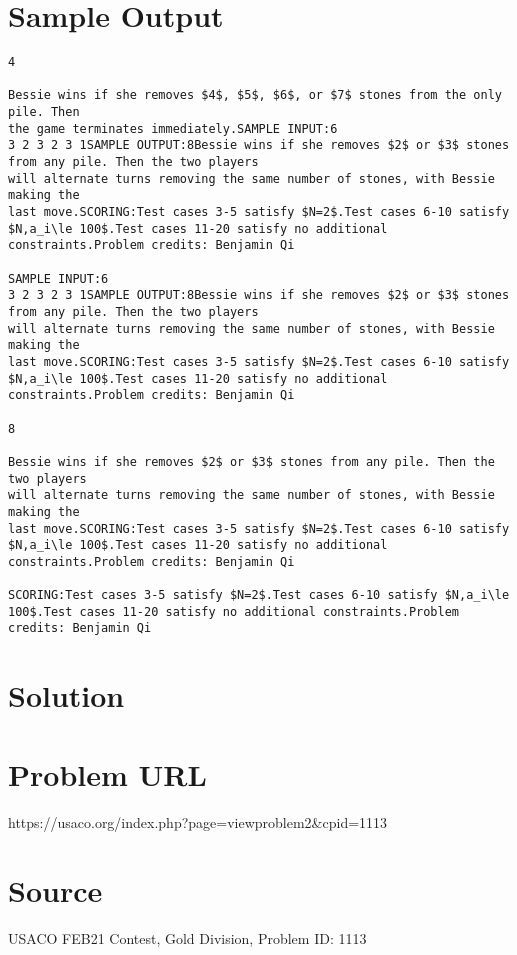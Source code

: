 \documentclass[12pt]{article}
\begin{document}
\section*{Sample Output}
\begin{verbatim}
4

Bessie wins if she removes $4$, $5$, $6$, or $7$ stones from the only pile. Then
the game terminates immediately.SAMPLE INPUT:6
3 2 3 2 3 1SAMPLE OUTPUT:8Bessie wins if she removes $2$ or $3$ stones from any pile. Then the two players
will alternate turns removing the same number of stones, with Bessie making the
last move.SCORING:Test cases 3-5 satisfy $N=2$.Test cases 6-10 satisfy $N,a_i\le 100$.Test cases 11-20 satisfy no additional constraints.Problem credits: Benjamin Qi

SAMPLE INPUT:6
3 2 3 2 3 1SAMPLE OUTPUT:8Bessie wins if she removes $2$ or $3$ stones from any pile. Then the two players
will alternate turns removing the same number of stones, with Bessie making the
last move.SCORING:Test cases 3-5 satisfy $N=2$.Test cases 6-10 satisfy $N,a_i\le 100$.Test cases 11-20 satisfy no additional constraints.Problem credits: Benjamin Qi

8

Bessie wins if she removes $2$ or $3$ stones from any pile. Then the two players
will alternate turns removing the same number of stones, with Bessie making the
last move.SCORING:Test cases 3-5 satisfy $N=2$.Test cases 6-10 satisfy $N,a_i\le 100$.Test cases 11-20 satisfy no additional constraints.Problem credits: Benjamin Qi

SCORING:Test cases 3-5 satisfy $N=2$.Test cases 6-10 satisfy $N,a_i\le 100$.Test cases 11-20 satisfy no additional constraints.Problem credits: Benjamin Qi
\end{verbatim}

\section*{Solution}


\section*{Problem URL}
https://usaco.org/index.php?page=viewproblem2&cpid=1113

\section*{Source}
USACO FEB21 Contest, Gold Division, Problem ID: 1113
\end{document}
